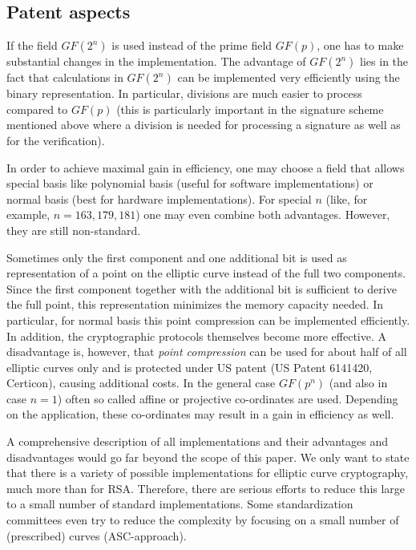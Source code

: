 \subsection{Patent aspects}

If the field $GF(2^n)$ is used instead of the prime field $GF(p)$, one has to make substantial changes in the implementation. The advantage of $GF(2^n)$ lies in the fact that calculations in $GF(2^n)$ can be implemented very efficiently using the binary representation. In particular, divisions are much easier to process compared to $GF(p)$ (this is particularly important in the signature scheme mentioned above where a division is needed for processing a signature as well as for the verification).

In order to achieve maximal gain in efficiency, one may choose a field that allows special basis like polynomial basis (useful for software implementations) or normal basis (best for hardware implementations). For special $n$ (like, for example, $n=163,179,181$) one may even combine both advantages. However, they are still non-standard.

Sometimes only the first component and one additional bit is used as representation of a point on the elliptic curve instead of the full two components. Since the first component together with the additional bit is sufficient to derive the full point, this representation minimizes the memory capacity needed. In particular, for normal basis this point compression can be implemented efficiently. In addition, the cryptographic protocols themselves become more effective. A disadvantage is, however, that {\it point compression} can be used for about half of all elliptic curves only and is protected under
US patent (US Patent 6141420, Certicon), causing additional costs.
In the general case $GF(p^n)$ (and also in case $n=1$) often so called affine or projective co-ordinates are used. Depending on the application, these co-ordinates may result in a gain in efficiency as well.

A comprehensive description of all implementations and their advantages and disadvantages would go far beyond the scope of this paper. We only want to state that there is a variety of possible implementations for elliptic curve cryptography, much more than for RSA. Therefore, there are serious efforts to reduce this large to a small number of standard implementations. Some standardization committees even try to reduce the complexity by focusing on a small number of (prescribed) curves (ASC-approach).

